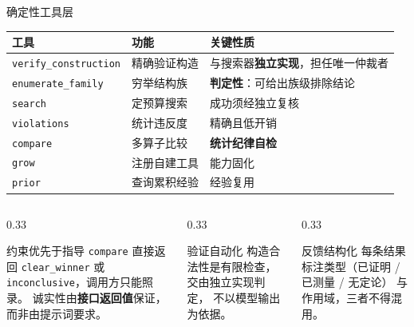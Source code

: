 \documentclass[aspectratio=169,11pt]{beamer}
\newcommand{\code}[1]{\texttt{\small #1}}
\begin{document}
\begin{frame}{确定性工具层}
  \begin{center}
  \scriptsize
  \begin{tabular}{@{}llp{}@{}}
    \toprule
    \textbf{工具} & \textbf{功能} & \textbf{关键性质} \\
    \midrule
    \code{verify\_construction} & 精确验证构造 & 与搜索器\textbf{独立实现}，担任唯一仲裁者 \\
    \code{enumerate\_family}    & 穷举结构族   & \textbf{判定性}：可给出族级排除结论 \\
    \code{search}               & 定预算搜索   & 成功须经独立复核 \\
    \code{violations}           & 统计违反度   & 精确且低开销 \\
    \code{compare}              & 多算子比较   & \textbf{统计纪律自检} \\
    \code{grow}                 & 注册自建工具 & 能力固化 \\
    \code{prior}                & 查询累积经验 & 经验复用 \\
    \bottomrule
  \end{tabular}
  \end{center}

  \vspace{0.5em}
  \begin{columns}[T,onlytextwidth]
    \begin{column}{0.33\textwidth}
      \begin{block}{约束优先于指导}
        \footnotesize
        \code{compare} 直接返回 \code{clear\_winner} 或
        \code{inconclusive}，调用方只能照录。
        诚实性由\textbf{接口返回值}保证，而非由提示词要求。
      \end{block}
    \end{column}
    \begin{column}{0.33\textwidth}
      \begin{block}{验证自动化}
        \footnotesize
        构造合法性是有限检查，交由独立实现判定，
        不以模型输出为依据。
      \end{block}
    \end{column}
    \begin{column}{0.33\textwidth}
      \begin{block}{反馈结构化}
        \footnotesize
        每条结果标注类型（已证明 / 已测量 / 无定论）
        与作用域，三者不得混用。
      \end{block}
    \end{column}
  \end{columns}
\end{frame}
\end{document}
